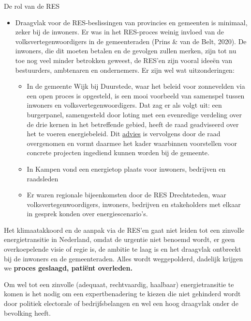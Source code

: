 \begin{voorstel}{De rol van de RES}
\begin{uitdaging}
\begin{itemize}
	\item Draagvlak voor de RES-beslissingen van provincies en gemeenten is minimaal, zeker bij de inwoners. Er was in het RES-proces weinig invloed van de volksvertegenwoordigers in de gemeenteraden (Prins \& van de Belt, 2020). De inwoners, die dit moeten betalen en de gevolgen zullen merken, zijn tot nu toe nog veel minder betrokken geweest, de RES’en zijn vooral ideeën van bestuurders, ambtenaren en ondernemers. Er zijn wel wat uitzonderingen:
	\begin{itemize}
		\item In de gemeente Wijk bij Duurstede, waar het beleid voor zonnevelden via een open proces is opgesteld,  is een mooi voorbeeld van samenspel tussen inwoners en volksvertegenwoordigers. Dat zag er als volgt uit: een burgerpanel, samengesteld door loting met een evenredige verdeling over de drie kernen in het betreffende gebied, heeft de raad geadviseerd over het te voeren energiebeleid. Dit \href{https://zonneveldenwijkbijduurstede.nl/wp-content/uploads/2019/11/20190613-Advies-Burgerpanel-zonnevelden.pdf}{advies} is vervolgens door de raad overgenomen en vormt daarmee het kader waarbinnen voorstellen voor concrete projecten ingediend kunnen worden bij de gemeente.
		\item In Kampen vond een energietop plaats voor inwoners, bedrijven en raadsleden
		\item Er waren regionale bijeenkomsten door de RES Drechtsteden, waar volksvertegenwoordigers, inwoners, bedrijven en stakeholders met elkaar in gesprek konden over energiescenario’s.
	\end{itemize}
\end{itemize}

\end{uitdaging}

\begin{overwegingen}
Het klimaatakkoord en de aanpak via de RES’en gaat niet leiden tot een zinvolle energietransitie in Nederland, omdat de urgentie niet benoemd wordt, er geen overkoepelende visie of regie is, de ambitie te laag is en het draagvlak ontbreekt bij de inwoners en de gemeenteraden. Alles wordt weggepolderd, dadelijk krijgen we \textbf{proces geslaagd, patiënt overleden.}

Om wel tot een zinvolle (adequaat, rechtvaardig, haalbaar) energietransitie te komen is het nodig om een expertbenadering te kiezen die niet gehinderd wordt door politiek electorale of bedrijfsbelangen en wel een hoog draagvlak onder de bevolking heeft.


\end{overwegingen}
\end{voorstel}
